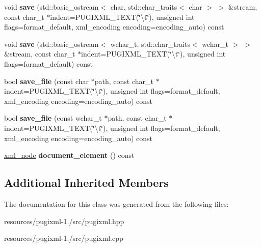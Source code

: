 \begin{DoxyCompactItemize}
\item 
\hypertarget{classpugi_1_1xml__document_a471d7354af62da143f10943057c99ffa}{void {\bfseries save} (std\+::basic\+\_\+ostream$<$ char, std\+::char\+\_\+traits$<$ char $>$ $>$ \&stream, const char\+\_\+t $\ast$indent=P\+U\+G\+I\+X\+M\+L\+\_\+\+T\+E\+X\+T(\char`\"{}\textbackslash{}t\char`\"{}), unsigned int flags=format\+\_\+default, xml\+\_\+encoding encoding=encoding\+\_\+auto) const }\label{classpugi_1_1xml__document_a471d7354af62da143f10943057c99ffa}

\item 
\hypertarget{classpugi_1_1xml__document_ae0b377bda28c7fbac4ba50b4e3f9d211}{void {\bfseries save} (std\+::basic\+\_\+ostream$<$ wchar\+\_\+t, std\+::char\+\_\+traits$<$ wchar\+\_\+t $>$ $>$ \&stream, const char\+\_\+t $\ast$indent=P\+U\+G\+I\+X\+M\+L\+\_\+\+T\+E\+X\+T(\char`\"{}\textbackslash{}t\char`\"{}), unsigned int flags=format\+\_\+default) const }\label{classpugi_1_1xml__document_ae0b377bda28c7fbac4ba50b4e3f9d211}

\item 
\hypertarget{classpugi_1_1xml__document_ac67294573cbaa41d3e6210480a9f7f99}{bool {\bfseries save\+\_\+file} (const char $\ast$path, const char\+\_\+t $\ast$indent=P\+U\+G\+I\+X\+M\+L\+\_\+\+T\+E\+X\+T(\char`\"{}\textbackslash{}t\char`\"{}), unsigned int flags=format\+\_\+default, xml\+\_\+encoding encoding=encoding\+\_\+auto) const }\label{classpugi_1_1xml__document_ac67294573cbaa41d3e6210480a9f7f99}

\item 
\hypertarget{classpugi_1_1xml__document_a47e18cd3438eabd64fa2f82d56b08aef}{bool {\bfseries save\+\_\+file} (const wchar\+\_\+t $\ast$path, const char\+\_\+t $\ast$indent=P\+U\+G\+I\+X\+M\+L\+\_\+\+T\+E\+X\+T(\char`\"{}\textbackslash{}t\char`\"{}), unsigned int flags=format\+\_\+default, xml\+\_\+encoding encoding=encoding\+\_\+auto) const }\label{classpugi_1_1xml__document_a47e18cd3438eabd64fa2f82d56b08aef}

\item 
\hypertarget{classpugi_1_1xml__document_aa3b17a8891e2c89996ab4c7a2a6759ad}{\hyperlink{classpugi_1_1xml__node}{xml\+\_\+node} {\bfseries document\+\_\+element} () const }\label{classpugi_1_1xml__document_aa3b17a8891e2c89996ab4c7a2a6759ad}

\end{DoxyCompactItemize}
\subsection*{Additional Inherited Members}


The documentation for this class was generated from the following files\+:\begin{DoxyCompactItemize}
\item 
resources/pugixml-\/1./src/pugixml.\+hpp\item 
resources/pugixml-\/1./src/pugixml.\+cpp\end{DoxyCompactItemize}
